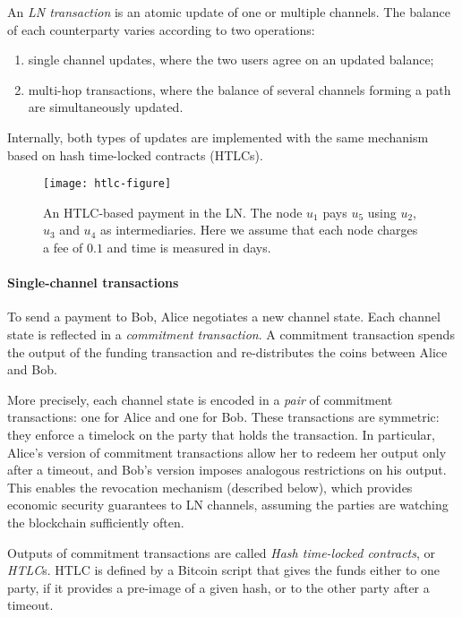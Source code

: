 An \textit{LN transaction} is an atomic update of one or multiple channels.
The balance of each counterparty varies according to two operations:
\begin{enumerate}
	\item single channel updates, where the two users agree on an updated balance;
	\item multi-hop transactions, where the balance of several channels forming a path are simultaneously updated.
\end{enumerate}

Internally, both types of updates are implemented with the same mechanism based on hash time-locked contracts (HTLCs).

\begin{figure*}[tb]
	\texttt{[image: htlc-figure]}
	\caption{An HTLC-based payment in the LN. The node $u_1$ pays $u_5$ using $u_2$, $u_3$ and $u_4$ as intermediaries. 
		Here we assume that each node charges a fee of $0.1$ and time is measured in days.\label{fig:htlc}}
\end{figure*}

\paragraph{Single-channel transactions}

To send a payment to Bob, Alice negotiates a new channel state.
Each channel state is reflected in a \textit{commitment transaction}.
A commitment transaction spends the output of the funding transaction and re-distributes the coins between Alice and Bob.

More precisely, each channel state is encoded in a \textit{pair} of commitment transactions: one for Alice and one for Bob.
These transactions are symmetric: they enforce a timelock on the party that holds the transaction.
In particular, Alice's version of commitment transactions allow her to redeem her output only after a timeout, and Bob's version imposes analogous restrictions on his output.
This enables the revocation mechanism (described below), which provides economic security guarantees to LN channels, assuming the parties are watching the blockchain sufficiently often.

Outputs of commitment transactions are called \textit{Hash time-locked contracts}, or \textit{HTLC}s.
HTLC is defined by a Bitcoin script that gives the funds either to one party, if it provides a pre-image of a given hash, or to the other party after a timeout.

